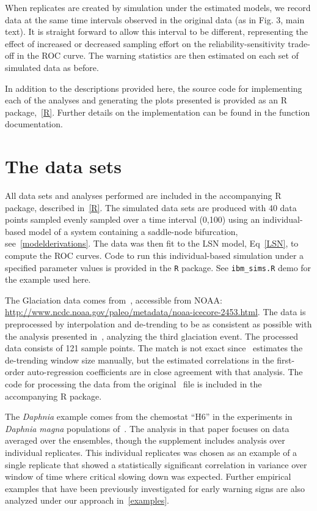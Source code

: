 \documentclass[authoryear, preprint,review,12pt]{elsarticle}
\begin{document}
When replicates are created by simulation under the estimated models, we record data at the same time intervals observed in the original data (as in Fig. 3, main text).  It is straight forward to allow this interval to be different, representing the effect of increased or decreased sampling effort on the reliability-sensitivity trade-off in the ROC curve.  The warning statistics are then estimated on each set of simulated data as before. 

In addition to the descriptions provided here, the source code for implementing each of the analyses and generating the plots presented is provided as an R package,~\ref{R}. Further details on the implementation can be found in the function documentation. 

\section{The data sets}\label{data}
All data sets and analyses performed are included in the accompanying R package, described in~\ref{R}.
The simulated data sets are produced with 40 data points
sampled evenly sampled over a time interval (0,100) using an individual-based model of a system containing a saddle-node bifurcation, see~\ref{modelderivations}.  The data was then fit to the LSN model, Eq~\eqref{LSN}, to compute the ROC curves. 
Code to run this individual-based simulation under a specified parameter values is provided in the \texttt{R} package.  
See \verb|ibm_sims.R| demo for the example used here.  

The Glaciation data comes from~\citet{Petit1999}, accessible from NOAA:\\
\href{http://www.ncdc.noaa.gov/paleo/metadata/noaa-icecore-2453.html}{http://www.ncdc.noaa.gov/paleo/metadata/noaa-icecore-2453.html}.
The data is preprocessed by interpolation and de-trending to be as consistent as possible with the analysis presented in~\citet{Dakos2008},
analyzing the third glaciation event. 
The processed data consists of 121 sample points. 
The match is not exact since~\citet{Dakos2008} estimates the de-trending window size manually,
but the estimated correlations in the first-order auto-regression coefficients are in close agreement with that analysis. 
The code for processing the data from the original~\citet{Petit1999} file is included in the accompanying R package.  


The \emph{Daphnia} example comes from the chemostat ``H6'' in the experiments in \emph{Daphnia magna} populations of~\citet{Drake2010}. 
The analysis in that paper focuses on data averaged over the ensembles, though the supplement includes analysis over individual replicates. 
This individual replicates was chosen as an example of a single replicate 
that showed a statistically significant correlation in variance over window of time where critical slowing down was expected. 
Further empirical examples that have been previously investigated for early warning signs are also analyzed under our approach in~\ref{examples}.   
\end{document}
